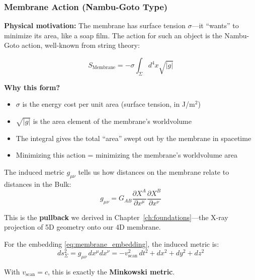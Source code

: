 \subsubsection{Membrane Action (Nambu-Goto Type)}

\textbf{Physical motivation:} The membrane has surface tension $\sigma$---it ``wants'' to minimize its area, like a soap film. The action for such an object is the Nambu-Goto action, well-known from string theory:

\begin{equation}
S_{\text{Membrane}} = -\sigma \int_{\Sigma} d^4x \sqrt{|g|}
\label{eq:membrane_action}
\end{equation}

\textbf{Why this form?}
\begin{itemize}
    \item $\sigma$ is the energy cost per unit area (surface tension, in J/m$^2$)
    \item $\sqrt{|g|}$ is the area element of the membrane's worldvolume
    \item The integral gives the total ``area'' swept out by the membrane in spacetime
    \item Minimizing this action = minimizing the membrane's worldvolume area
\end{itemize}

The induced metric $g_{\mu\nu}$ tells us how distances on the membrane relate to distances in the Bulk:
\begin{equation}
g_{\mu\nu} = G_{AB} \frac{\partial X^A}{\partial x^\mu} \frac{\partial X^B}{\partial x^\nu}
\label{eq:induced_metric}
\end{equation}

This is the \textbf{pullback} we derived in Chapter~\ref{ch:foundations}---the X-ray projection of 5D geometry onto our 4D membrane.

For the embedding \eqref{eq:membrane_embedding}, the induced metric is:
\begin{equation}
ds^2_{\Sigma} = g_{\mu\nu}\,dx^\mu dx^\nu = -v_{\text{scan}}^2\,dt^2 + dx^2 + dy^2 + dz^2
\end{equation}

With $v_{\text{scan}} = c$, this is exactly the \textbf{Minkowski metric}.

